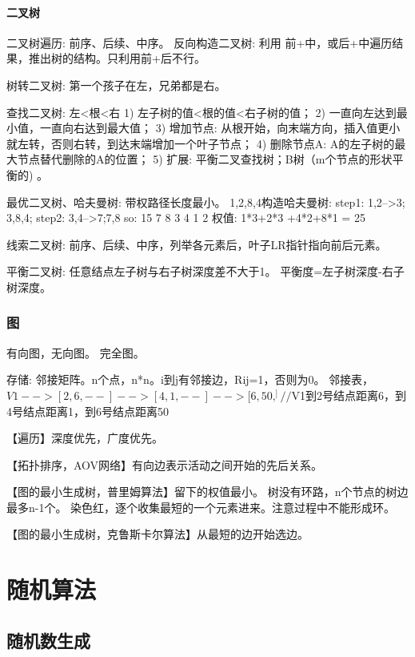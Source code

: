 \documentclass[UTF8]{../computerUniverse}
\begin{document}
\subsubsection{二叉树}

二叉树遍历: 前序、后续、中序。
反向构造二叉树: 利用 前+中，或后+中遍历结果，推出树的结构。只利用前+后不行。

树转二叉树: 第一个孩子在左，兄弟都是右。


查找二叉树: 左<根<右
1) 左子树的值<根的值<右子树的值；
2) 一直向左达到最小值，一直向右达到最大值；
3) 增加节点: 从根开始，向末端方向，插入值更小就左转，否则右转，到达末端增加一个叶子节点；
4) 删除节点A: A的左子树的最大节点替代删除的A的位置；
5) 扩展: 平衡二叉查找树；B树（m个节点的形状平衡的) 。



最优二叉树、哈夫曼树: 带权路径长度最小。 
1,2,8,4构造哈夫曼树: 
step1: 1,2-->3; 3,8,4;
step2: 3,4-->7;7,8
so:        15
      7       8
   3    4
1    2
权值:  1*3+2*3 +4*2+8*1 = 25

线索二叉树: 前序、后续、中序，列举各元素后，叶子LR指针指向前后元素。

平衡二叉树: 
任意结点左子树与右子树深度差不大于1。
平衡度=左子树深度-右子树深度。



\subsection{图}
有向图，无向图。
完全图。

存储: 
邻接矩阵。n个点，n*n。i到j有邻接边，Rij=1，否则为0。
邻接表，$V1-->[2,6,--]-->[4,1,--]-->[6,50,^]//$V1到2号结点距离6，到4号结点距离1，到6号结点距离50

【遍历】深度优先，广度优先。

【拓扑排序，AOV网络】有向边表示活动之间开始的先后关系。

【图的最小生成树，普里姆算法】留下的权值最小。
树没有环路，n个节点的树边最多n-1个。
染色红，逐个收集最短的一个元素进来。注意过程中不能形成环。

【图的最小生成树，克鲁斯卡尔算法】从最短的边开始选边。




\chapter{随机算法}


\section{随机数生成}
\end{document}
